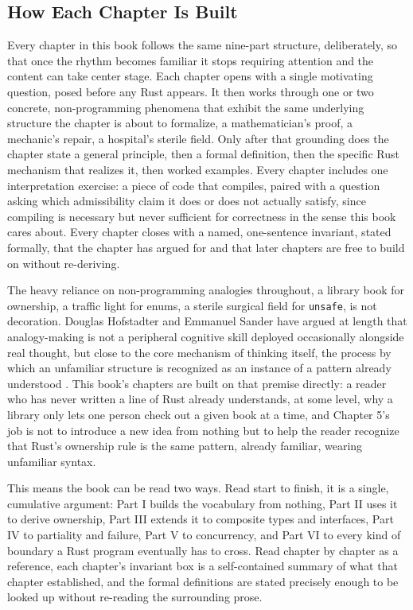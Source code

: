 \documentclass[11pt]{book}
\begin{document}
\subsection*{How Each Chapter Is Built}

Every chapter in this book follows the same nine-part structure, deliberately, so that once the rhythm becomes familiar it stops requiring attention and the content can take center stage. Each chapter opens with a single motivating question, posed before any Rust appears. It then works through one or two concrete, non-programming phenomena that exhibit the same underlying structure the chapter is about to formalize, a mathematician's proof, a mechanic's repair, a hospital's sterile field. Only after that grounding does the chapter state a general principle, then a formal definition, then the specific Rust mechanism that realizes it, then worked examples. Every chapter includes one interpretation exercise: a piece of code that compiles, paired with a question asking which admissibility claim it does or does not actually satisfy, since compiling is necessary but never sufficient for correctness in the sense this book cares about. Every chapter closes with a named, one-sentence invariant, stated formally, that the chapter has argued for and that later chapters are free to build on without re-deriving.

The heavy reliance on non-programming analogies throughout, a library book for ownership, a traffic light for enums, a sterile surgical field for \texttt{unsafe}, is not decoration. Douglas Hofstadter and Emmanuel Sander have argued at length that analogy-making is not a peripheral cognitive skill deployed occasionally alongside real thought, but close to the core mechanism of thinking itself, the process by which an unfamiliar structure is recognized as an instance of a pattern already understood \cite{hofstadter2013}. This book's chapters are built on that premise directly: a reader who has never written a line of Rust already understands, at some level, why a library only lets one person check out a given book at a time, and Chapter 5's job is not to introduce a new idea from nothing but to help the reader recognize that Rust's ownership rule is the same pattern, already familiar, wearing unfamiliar syntax.

This means the book can be read two ways. Read start to finish, it is a single, cumulative argument: Part I builds the vocabulary from nothing, Part II uses it to derive ownership, Part III extends it to composite types and interfaces, Part IV to partiality and failure, Part V to concurrency, and Part VI to every kind of boundary a Rust program eventually has to cross. Read chapter by chapter as a reference, each chapter's invariant box is a self-contained summary of what that chapter established, and the formal definitions are stated precisely enough to be looked up without re-reading the surrounding prose.
\end{document}
